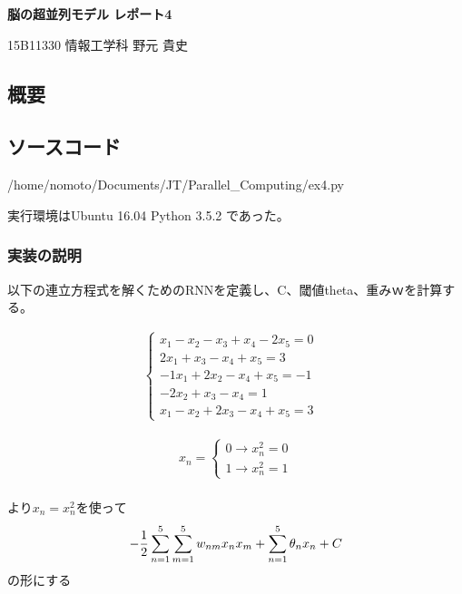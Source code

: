 \documentclass[a4j,11pt,twoside]{jarticle}
\begin{document}
	\begin{center}
	{\LARGE \bf{脳の超並列モデル レポート4}}
	\vspace{1cm}

	{\textrm{15B11330 情報工学科  野元 貴史}}
	\end{center}
  \subsection*{概要}

	\subsection*{ソースコード}
    
    {/home/nomoto/Documents/JT/Parallel_Computing/ex4.py}

    実行環境はUbuntu 16.04 Python 3.5.2 であった。 \\

    \subsubsection*{実装の説明}
    以下の連立方程式を解くためのRNNを定義し、C、閾値theta、重みｗを計算する。

    \begin{eqnarray*}
      \begin{cases}
        x_1 - x_2 - x_3 + x_4 -2 x_5 = 0 &\\
        2 x_1 + x_3 - x_4 + x_5 = 3 &\\
        -1 x_1 + 2 x_2 - x_4 + x_5 = -1 &\\
        -2 x_2 + x_3 - x_4 = 1 &\\
        x_1 - x_2 + 2 x_3 - x_4 + x_5 = 3
      \end{cases}
    \end{eqnarray*}


    \begin{eqnarray*}
    x_n
     =
      \begin{cases}
        0 \rightarrow x_n^2 = 0 \\
        1 \rightarrow x_n^2 = 1
      \end{cases}
    \end{eqnarray*} \\

    より$ x_n = x_n^2 を使って$
    $$
    -\frac{1}{2}\sum_{n=1}^{5}\sum_{m=1}^{5} w_{nm}x_nx_m + \sum_{n=1}^{5}\theta_n x_n + C \\
    $$
    の形にする
\end{document}
